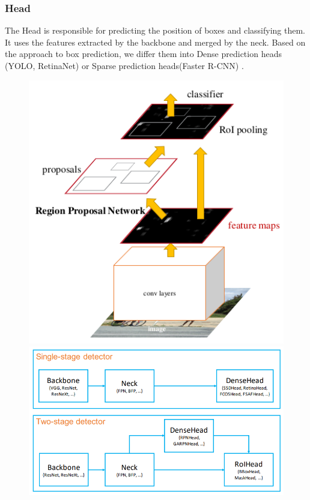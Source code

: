 \subsubsection{Head}
The Head is responsible for predicting the position of boxes and classifying them. It uses the features extracted by the backbone and merged by the neck. Based on the approach to box prediction, we differ them into Dense prediction heads (YOLO, RetinaNet) or Sparse prediction heads(Faster R-CNN) \cite{Bochkovskiy2020}.


\begin{figure}
    \begin{floatrow}[2]
        {\includegraphics[width=\linewidth]{images/FasterRcnn.png}}\qquad
        {\includegraphics[width=\linewidth]{images/object_detection_architecture.png}}
    \end{floatrow}
\end{figure}

